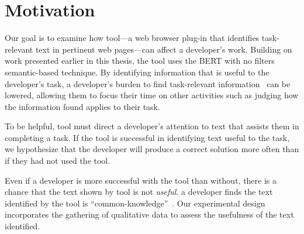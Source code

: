 


\section{Motivation}
\label{cp6:method}



Our goal is to examine how \acs{tool}---a web browser plug-in that 
 identifies
task-relevant text in pertinent
web pages---can affect a developer's work.
Building on work presented earlier in this
thesis, the tool  uses the BERT with no filters semantic-based technique.
By identifying information that is useful to the developer's task,
a developer's burden to find task-relevant information~\cite{Robillard2015}
can be lowered,
allowing them to focus their time on other activities such as judging how the information found applies to their task.


To be helpful, \acs{tool} must direct a developer's attention to text that assists them in completing a task.
If the tool is successful in identifying text useful to the task, we hypothesize that
the developer will produce a correct solution more often than if they had not used the tool.


Even if a developer is more successful
with the tool than without, there is a chance that the text shown by \acs{tool} is not \textit{useful}. 
a developer finds  the text identified by the tool is ``common-knowledge''~\cite{cwalina2008, Robillard2015}. Our experimental design incorporates the gathering of qualitative data to assess the usefulness of the text identified.

 

